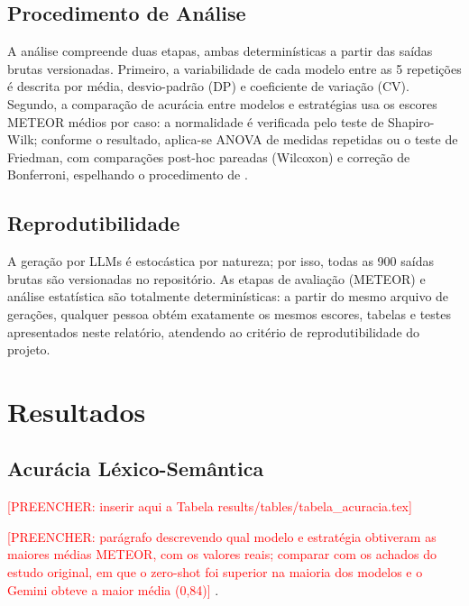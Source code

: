 \documentclass[12pt]{article}
\newcommand{\preencher}[1]{\textcolor{red}{[PREENCHER: #1]}}
\begin{document}
\subsection{Procedimento de Análise}

A análise compreende duas etapas, ambas determinísticas a partir das saídas brutas versionadas. Primeiro, a variabilidade de cada modelo entre as 5 repetições é descrita por média, desvio-padrão (DP) e coeficiente de variação (CV). Segundo, a comparação de acurácia entre modelos e estratégias usa os escores METEOR médios por caso: a normalidade é verificada pelo teste de Shapiro-Wilk; conforme o resultado, aplica-se ANOVA de medidas repetidas ou o teste de Friedman, com comparações post-hoc pareadas (Wilcoxon) e correção de Bonferroni, espelhando o procedimento de \cite{fernandes2025}.

\subsection{Reprodutibilidade}

A geração por LLMs é estocástica por natureza; por isso, todas as 900 saídas brutas são versionadas no repositório. As etapas de avaliação (METEOR) e análise estatística são totalmente determinísticas: a partir do mesmo arquivo de gerações, qualquer pessoa obtém exatamente os mesmos escores, tabelas e testes apresentados neste relatório, atendendo ao critério de reprodutibilidade do projeto.

\section{Resultados}


\subsection{Acurácia Léxico-Semântica}

\preencher{inserir aqui a Tabela results/tables/tabela\_acuracia.tex}

\preencher{parágrafo descrevendo qual modelo e estratégia obtiveram as maiores médias METEOR, com os valores reais; comparar com os achados do estudo original, em que o zero-shot foi superior na maioria dos modelos e o Gemini obteve a maior média (0,84)} \cite{fernandes2025}.
\end{document}
